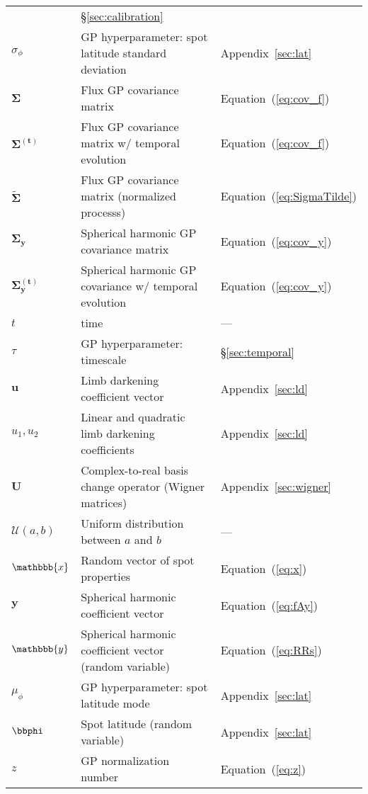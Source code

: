 \begin{center}
\begin{longtable}{W{c}{1cm} W{l}{9cm} W{l}{2cm}}
         & \S\ref{sec:calibration}
        \\
        $\sigma_\phi$
         & GP hyperparameter: spot latitude standard deviation
         & Appendix~\ref{sec:lat}
        \\
        $\pmb{\Sigma}$
         & Flux GP covariance matrix
         & Equation~(\ref{eq:cov_f})
        \\
        $\pmb{\Sigma}^\mathbf{(t)}$
         & Flux GP covariance matrix w/ temporal evolution
         & Equation~(\ref{eq:cov_f})
        \\
        $\tilde{\pmb{\Sigma}}$
         & Flux GP covariance matrix (normalized processs)
         & Equation~(\ref{eq:SigmaTilde})
        \\
        $\pmb{\Sigma}_\mathbf{y}$
         & Spherical harmonic GP covariance matrix
         & Equation~(\ref{eq:cov_y})
        \\
        $\pmb{\Sigma}_\mathbf{y}^\mathbf{(t)}$
         & Spherical harmonic GP covariance w/ temporal evolution
         & Equation~(\ref{eq:cov_y})
        \\
        $t$
         & time
         & ---
        \\
        $\tau$
         & GP hyperparameter: timescale
         & \S\ref{sec:temporal}
        \\
        $\mathbf{u}$
         & Limb darkening coefficient vector
         & Appendix~\ref{sec:ld}
        \\
        $u_1, u_2$
         & Linear and quadratic limb darkening coefficients
         & Appendix~\ref{sec:ld}
        \\
        $\mathbf{U}$
         & Complex-to-real basis change operator (Wigner matrices)
         & Appendix~\ref{sec:wigner}
        \\
        $\mathcal{U}(a, b)$
         & Uniform distribution between $a$ and $b$
         & ---
        \\
        $\mathbbb{x}$
         & Random vector of spot properties
         & Equation~(\ref{eq:x})
        \\
        $\mathbf{y}$
         & Spherical harmonic coefficient vector
         & Equation~(\ref{eq:fAy})
        \\
        $\mathbbb{y}$
         & Spherical harmonic coefficient vector (random variable)
         & Equation~(\ref{eq:RRs})
        \\
        $\mu_\phi$
         & GP hyperparameter: spot latitude mode
         & Appendix~\ref{sec:lat}
        \\
        $\bbphi$
         & Spot latitude (random variable)
         & Appendix~\ref{sec:lat}
        \\
        $z$
         & GP normalization number
         & Equation~(\ref{eq:z})
        \\
    \end{longtable}
\end{center}
